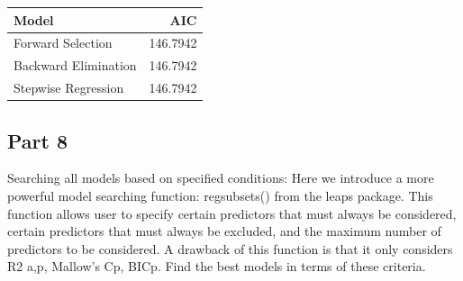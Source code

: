 \documentclass[
]{article}
\begin{document}
\begin{longtable}[]{@{}lr@{}}
\toprule\noalign{}
Model & AIC \\
\midrule\noalign{}
\endhead
\bottomrule\noalign{}
\endlastfoot
Forward Selection & 146.7942 \\
Backward Elimination & 146.7942 \\
Stepwise Regression & 146.7942 \\
\end{longtable}

\subsection{Part 8}\label{part-8}

Searching all models based on specified conditions: Here we introduce a
more powerful model searching function: regsubsets() from the leaps
package. This function allows user to specify certain predictors that
must always be considered, certain predictors that must always be
excluded, and the maximum number of predictors to be considered. A
drawback of this function is that it only considers R2 a,p, Mallow's Cp,
BICp. Find the best models in terms of these criteria.
\end{document}
